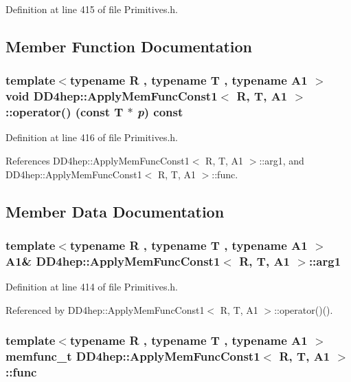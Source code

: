 Definition at line 415 of file Primitives.h.

\subsection{Member Function Documentation}
\hypertarget{struct_d_d4hep_1_1_apply_mem_func_const1_ad9a08fd0b4b65c1b22d6ce088bad256c}{
\subsubsection[{operator()}]{\setlength{\rightskip}{0pt plus 5cm}template$<$typename R , typename T , typename A1 $>$ void {\bf DD4hep::ApplyMemFuncConst1}$<$ R, {\bf T}, A1 $>$::operator() (const {\bf T} $\ast$ {\em p}) const}}
\label{struct_d_d4hep_1_1_apply_mem_func_const1_ad9a08fd0b4b65c1b22d6ce088bad256c}


Definition at line 416 of file Primitives.h.

References DD4hep::ApplyMemFuncConst1$<$ R, T, A1 $>$::arg1, and DD4hep::ApplyMemFuncConst1$<$ R, T, A1 $>$::func.

\subsection{Member Data Documentation}
\hypertarget{struct_d_d4hep_1_1_apply_mem_func_const1_a3bcafdc6a0f9deeb47c46e2a10b4fbe2}{
\subsubsection[{arg1}]{\setlength{\rightskip}{0pt plus 5cm}template$<$typename R , typename T , typename A1 $>$ A1\& {\bf DD4hep::ApplyMemFuncConst1}$<$ R, {\bf T}, A1 $>$::{\bf arg1}}}
\label{struct_d_d4hep_1_1_apply_mem_func_const1_a3bcafdc6a0f9deeb47c46e2a10b4fbe2}


Definition at line 414 of file Primitives.h.

Referenced by DD4hep::ApplyMemFuncConst1$<$ R, T, A1 $>$::operator()().\hypertarget{struct_d_d4hep_1_1_apply_mem_func_const1_a924d23a16a5ec30552a0f78bcc3dee14}{
\subsubsection[{func}]{\setlength{\rightskip}{0pt plus 5cm}template$<$typename R , typename T , typename A1 $>$ {\bf memfunc\_\-t} {\bf DD4hep::ApplyMemFuncConst1}$<$ R, {\bf T}, A1 $>$::{\bf func}}}
\label{struct_d_d4hep_1_1_apply_mem_func_const1_a924d23a16a5ec30552a0f78bcc3dee14}


